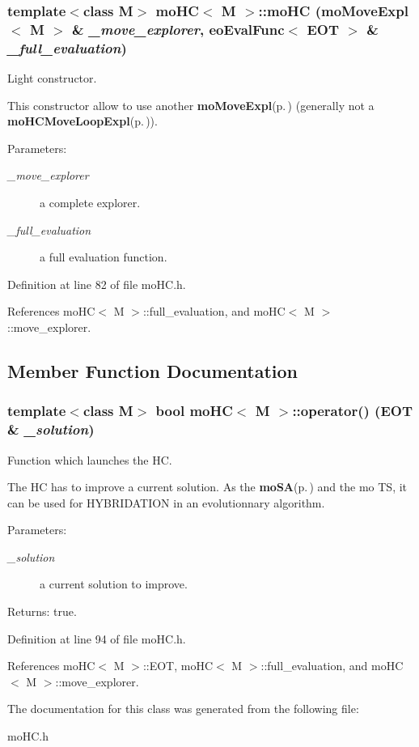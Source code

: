 \subsubsection{\setlength{\rightskip}{0pt plus 5cm}template$<$class M$>$ {\bf mo\-HC}$<$ M $>$::{\bf mo\-HC} ({\bf mo\-Move\-Expl}$<$ M $>$ \& {\em \_\-move\_\-explorer}, {\bf eo\-Eval\-Func}$<$ {\bf EOT} $>$ \& {\em \_\-full\_\-evaluation})\hspace{0.3cm}{\tt  [inline]}}\label{classmo_h_c_a1}


Light constructor. 

This constructor allow to use another {\bf mo\-Move\-Expl}{\rm (p.\,\pageref{classmo_move_expl})} (generally not a {\bf mo\-HCMove\-Loop\-Expl}{\rm (p.\,\pageref{classmo_h_c_move_loop_expl})}).

\begin{Desc}
\item[Parameters:]
\begin{description}
\item[{\em \_\-move\_\-explorer}]a complete explorer. \item[{\em \_\-full\_\-evaluation}]a full evaluation function. \end{description}
\end{Desc}


Definition at line 82 of file mo\-HC.h.

References mo\-HC$<$ M $>$::full\_\-evaluation, and mo\-HC$<$ M $>$::move\_\-explorer.

\subsection{Member Function Documentation}
\subsubsection{\setlength{\rightskip}{0pt plus 5cm}template$<$class M$>$ bool {\bf mo\-HC}$<$ M $>$::operator() ({\bf EOT} \& {\em \_\-solution})\hspace{0.3cm}{\tt  [inline]}}\label{classmo_h_c_a2}


Function which launches the HC. 

The HC has to improve a current solution. As the {\bf mo\-SA}{\rm (p.\,\pageref{classmo_s_a})} and the mo TS, it can be used for HYBRIDATION in an evolutionnary algorithm.

\begin{Desc}
\item[Parameters:]
\begin{description}
\item[{\em \_\-solution}]a current solution to improve. \end{description}
\end{Desc}
\begin{Desc}
\item[Returns:]true. \end{Desc}


Definition at line 94 of file mo\-HC.h.

References mo\-HC$<$ M $>$::EOT, mo\-HC$<$ M $>$::full\_\-evaluation, and mo\-HC$<$ M $>$::move\_\-explorer.

The documentation for this class was generated from the following file:\begin{CompactItemize}
\item 
mo\-HC.h\end{CompactItemize}
